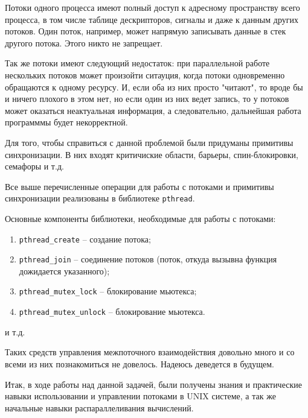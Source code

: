 \documentclass[12pt]{article}
\begin{document}
Потоки одного процесса имеют полный доступ к адресному пространству всего процесса, в том числе таблице дескрипторов, сигналы и даже к данным других потоков. Один поток, например, может напрямую записывать данные в стек другого потока. Этого никто не запрещает.

Так же потоки имеют следующий недостаток: при параллельной работе нескольких потоков может произойти ситауция, когда потоки одновременно обращаются к одному ресурсу. И, если оба из них просто "читают", то вроде бы и ничего плохого в этом нет, но если один из них ведет запись, то у потоков может оказаться неактуальная информация, а следовательно, дальнейшая работа программмы будет некорректной.

Для того, чтобы справиться с данной проблемой были придуманы примитивы синхронизации.
В них входят критичиские области, барьеры, спин-блокировки, семафоры и т.д.

Все выше перечисленные операции для работы с потоками и примитивы синхронизации реализованы в библиотеке \verb|pthread|.

Основные компоненты библиотеки, необходимые для работы с потоками:
\begin{enumerate}
    \item \verb|pthread_create|  -- создание потока;
     \item\verb|pthread_join| -- соединение потоков (поток, откуда вызывна функция дожидается указанного);
     \item\verb|pthread_mutex_lock| -- блокирование мьютекса;
     \item\verb|pthread_mutex_unlock| -- блокирование мьютекса.
\end{enumerate}

и т.д.

Таких средств управления межпоточного взаимодействия довольно много и со всеми из них познакомиться не довелось. Надеюсь деведется в будущем.

Итак, в ходе работы над данной задачей, были получены знания и практические навыки использовании и управлении потоками в UNIX системе, а так же начальные навыки распараллеливания вычислений.
\end{document}
